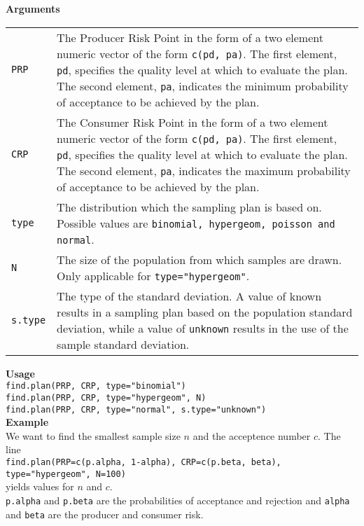\textbf{Arguments} \vspace{-0.5cm}
\begin{table}[H]
  \scriptsize
  \begin{tabularx}{\linewidth}{lX}
    \texttt{PRP} &
    The Producer Risk Point in the form of a two element numeric vector of the form \texttt{c(pd, pa)}. The first element, \texttt{pd}, specifies the quality level at which to evaluate the plan. The second element, \texttt{pa}, indicates the minimum probability of acceptance to be achieved by the plan.\\
    \texttt{CRP} &
    The Consumer Risk Point in the form of a two element numeric vector of the form \texttt{c(pd, pa)}. The first element, \texttt{pd}, specifies the quality level at which to evaluate the plan. The second element, \texttt{pa}, indicates the maximum probability of acceptance to be achieved by the plan.\\
    \texttt{type} &
    The distribution which the sampling plan is based on. Possible values are \texttt{binomial, hypergeom, poisson and normal}.\\
    \texttt{N} &
    The size of the population from which samples are drawn. Only applicable for \texttt{type="hypergeom"}.\\
    \texttt{s.type} &
    The type of the standard deviation. A value of known results in a sampling plan based on the population standard deviation, while a value of \texttt{unknown} results in the use of the sample standard deviation.
  \end{tabularx}
\end{table}

\textbf{Usage}\\
\texttt{find.plan(PRP, CRP, type="binomial")}\\
\texttt{find.plan(PRP, CRP, type="hypergeom", N)}\\
\texttt{find.plan(PRP, CRP, type="normal", s.type="unknown")}\\

\textbf{Example}\\
We want to find the smallest sample size $n$ and the acceptence number $c$. The line\\
\texttt{find.plan(PRP=c(p.alpha, 1-alpha), CRP=c(p.beta, beta), type="hypergeom", N=100)}\\
yields values for $n$ and $c$.\\
\texttt{p.alpha} and \texttt{p.beta} are the probabilities of acceptance and rejection and \texttt{alpha} and \texttt{beta} are the producer and consumer risk.\\

